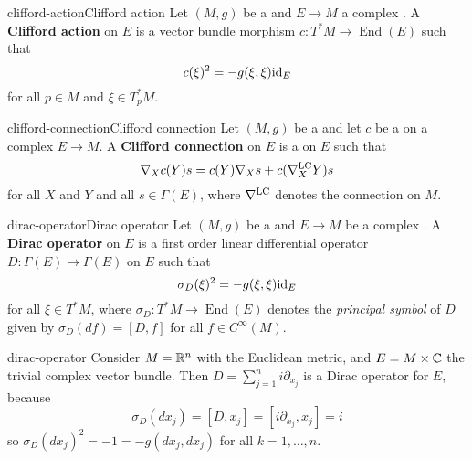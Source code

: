 \begin{topic}{clifford-action}{Clifford action}
    Let $(M, g)$ be a  and $E \to M$ a complex . A \textbf{Clifford action} on $E$ is a vector bundle morphism $c \colon T^*M \to \operatorname{End}(E)$ such that
    \[ c(\xi)^2 = - g(\xi, \xi) \textup{id}_E \]
    for all $p \in M$ and $\xi \in T^*_p M$.
\end{topic}

\begin{topic}{clifford-connection}{Clifford connection}
    Let $(M, g)$ be a  and let $c$ be a  on a complex  $E \to M$. A \textbf{Clifford connection} on $E$ is a  on $E$ such that
    \[ \nabla_X c(Y) s = c(Y) \nabla_X s + c(\nabla^{\textup{LC}}_X Y) s \]
    for all  $X$ and $Y$ and all $s \in \Gamma(E)$, where $\nabla^{\textup{LC}}$ denotes the  connection on $M$.
\end{topic}

\begin{topic}{dirac-operator}{Dirac operator}
    Let $(M, g)$ be a  and $E \to M$ be a complex . A \textbf{Dirac operator} on $E$ is a first order linear differential operator $D \colon \Gamma(E) \to \Gamma(E)$ on $E$ such that
    \[ \sigma_D(\xi)^2 = - g(\xi, \xi) \textup{id}_E \]
    for all $\xi \in T^*M$, where $\sigma_D \colon T^*M \to \operatorname{End}(E)$ denotes the \textit{principal symbol} of $D$ given by $\sigma_D(df) = [D, f]$ for all $f \in C^\infty(M)$.
\end{topic}

\begin{example}{dirac-operator}
    Consider $M = \mathbb{R}^n$ with the Euclidean metric, and $E = M \times \mathbb{C}$ the trivial complex vector bundle. Then $D = \sum_{j = 1}^{n} i \partial_{x_j}$ is a Dirac operator for $E$, because
    \[ \sigma_D(dx_j) = [D, x_j] = [i \partial_{x_j}, x_j] = i \]
    so $\sigma_D(dx_j)^2 = -1 = - g(dx_j, dx_j)$ for all $k = 1, \ldots, n$.
\end{example}

